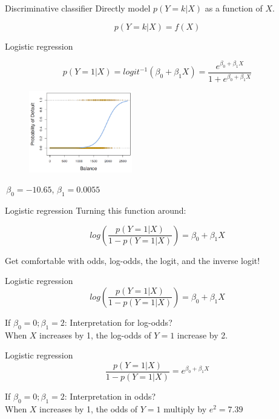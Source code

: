 \documentclass[xcolor=table,aspectratio=169]{beamer}
\begin{document}
\begin{frame}{Discriminative classifier}
	Directly model $p(Y = k | X)$ as a function of $X$.
	
	
	$$p(Y = k | X) = f(X)$$
	
\end{frame}
\begin{frame}{Logistic regression}
	
	$$p(Y = 1 | X) = logit^{-1}(\beta_0 + \beta_1 X) = \frac{e^{\beta_0 + \beta_1 X}}{1 + e^{\beta_0 + \beta_1 X}}$$
	
	\begin{figure}
		\includegraphics[width=0.4\textwidth]{pics/logistic.png}
	\end{figure}
	
	
 	\,\hfill$\beta_0 = -10.65$, $\beta_1 = 0.0055$
	
\end{frame}

\begin{frame}{Logistic regression}
	Turning this function around:
	
	$$log\left(\frac{p(Y = 1 | X)}{1-p(Y = 1 | X)}\right) = \beta_0 + \beta_1 X$$
	
	Get comfortable with odds, log-odds, the logit, and the inverse logit!
	
\end{frame}

\begin{frame}{Logistic regression}
	$$log\left(\frac{p(Y = 1 | X)}{1-p(Y = 1 | X)}\right) = \beta_0 + \beta_1 X$$
	
	If  $\beta_0 = 0; \beta_1 = 2$:	Interpretation for log-odds? \\
	
	When $X$ increases by 1, the log-odds of $Y = 1$ increase by 2. \\
	
\end{frame}

\begin{frame}{Logistic regression}
	$$\frac{p(Y = 1 | X)}{1-p(Y = 1 | X)} = e^{\beta_0 + \beta_1 X}$$
	
	If  $\beta_0 = 0; \beta_1 = 2$:	Interpretation in odds?\\
	
	When $X$ increases by 1, the odds of $Y = 1$ multiply by $e^2 = 7.39$ \\
	
\end{frame}
\end{document}
